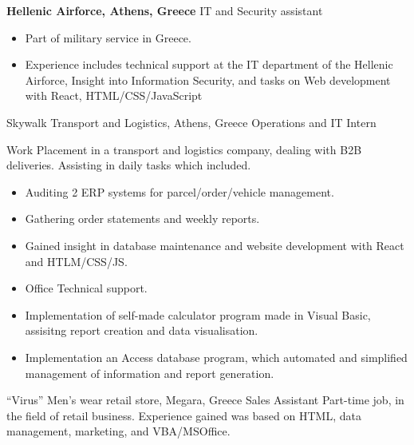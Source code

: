 {\textbf{Hellenic Airforce, Athens, Greece}}
{IT and Security assistant}
{
    \begin{itemize}
        \item Part of military service in Greece.
        \item Experience includes technical support at the IT department of the Hellenic Airforce, Insight into Information Security, and tasks on Web development with React, HTML/CSS/JavaScript
    \end{itemize}
}

{Skywalk Transport and Logistics, Athens, Greece }
{Operations and IT Intern}
{

    Work Placement in a transport and logistics company, dealing with B2B deliveries. Assisting in daily tasks which included.
    \begin{itemize}
        \item Auditing 2 ERP systems for parcel/order/vehicle management.
        \item Gathering order statements and weekly reports.
        \item Gained insight in database maintenance and website development with React and HTLM/CSS/JS.
        \item Office Technical support.
        \item Implementation of self-made calculator program made in Visual Basic, assisitng report creation and data visualisation.
        \item Implementation an Access database program, which automated and simplified management of information and report generation.

    \end{itemize}
}

{“Virus” Men’s wear retail store, Megara, Greece}
{Sales Assistant}
{
    Part-time job, in the field of retail business. Experience gained was based on HTML, data management, marketing, and VBA/MSOffice.
}
